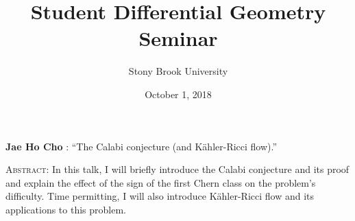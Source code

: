 \documentclass[11pt]{article}
\title{Student Differential Geometry Seminar}
\author{Stony Brook University}
\date{October 1, 2018}
\makeatletter
\newcommand{\spe@ker}{}
\newcommand{\t@lktitle}{}
\newcommand{\@ffili@tion}{}
\newcommand{\speaker}[1]{%
  \renewcommand{\spe@ker}{#1}}
\newcommand{\talktitle}[1]{%
  \renewcommand{\t@lktitle}{#1}}
\newcommand{\affiliation}[1]{%
  \renewcommand{\@ffili@tion}{#1}}
\renewenvironment{abstract}{%
  \begin{center}
    \large
    \textbf{\spe@ker} %
    : ``\t@lktitle''
  \end{center}
  \begin{trivlist}
  \item\textsc{Abstract:}}{%
  \end{trivlist}}
\makeatother
\begin{document}
\maketitle
\thispagestyle{empty}

\speaker{Jae Ho Cho}
\talktitle{The Calabi conjecture (and K\"ahler-Ricci flow).}

\begin{abstract}
In this talk, I will briefly introduce the Calabi conjecture and its proof and explain the effect of the sign of the first Chern class on the problem's difficulty. Time permitting, I will also introduce K\"ahler-Ricci flow and its applications to this problem. 
\end{abstract}
\end{document}
